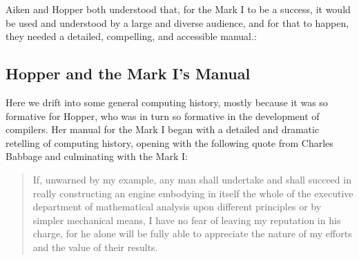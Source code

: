 Aiken and Hopper both understood that, for the Mark I to be a success, it would be used
and understood by a large and diverse audience, and for that to happen, they
needed a detailed, compelling, and accessible
manual.\cite{annals_of_the_computation_laboratory_of_harvard_university_1946}:


\subsection{Hopper and the Mark I's Manual}

Here we drift into some general computing history,
mostly because it was so formative for Hopper, who was in turn so
formative in the development of compilers.
Her manual for the Mark I
began with a detailed and dramatic retelling of computing history,
opening with the following quote from Charles Babbage
and culminating with the Mark I:

\begin{quotation}
	If, unwarned by my example, any man shall undertake
	and shall succeed in really constructing an engine embodying in
	itself the whole of the executive department of mathematical
	analysis upon different principles or by simpler mechanical means, I
	have no fear of leaving my reputation in his charge, for he alone
	will be fully able to appreciate the nature of my efforts and the
	value of their results.
\end{quotation}

